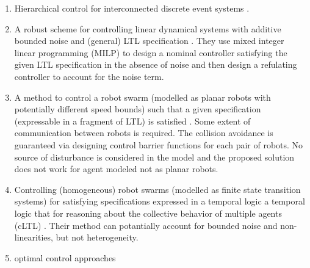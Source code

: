 \begin{enumerate}
	\item Hierarchical control for interconnected discrete event systems \cite{wong1996hierarchical,schmidt2008nonblocking}.
	\item A robust scheme for controlling linear dynamical systems with additive bounded noise and (general) LTL specification \cite{Yang2017milp}. They use mixed integer linear programming (MILP) to design a nominal controller satisfying the given LTL specification in the absence of noise and then design a refulating controller to account for the noise term.
	\item A method to control a robot swarm (modelled as planar robots with potentially different speed bounds) such that a given specification (expressable in a fragment of LTL) is satisfied \cite{Chen2018cbf}. Some extent of communication between robots is required. The collision avoidance is guaranteed via designing control barrier functions for each pair of robots. No source of disturbance is considered in the model and the proposed solution does not work for agent modeled not as planar robots.
	\item Controlling (homogeneous) robot swarms (modelled as finite state transition systems) for satisfying specifications expressed in a temporal logic a temporal logic that for reasoning about the collective behavior of multiple agents (cLTL) \cite{Shahin2017cltl,}. Their method can potantially account for bounded noise and non-linearities, but not heterogeneity.
	\item optimal control approaches 
\end{enumerate}